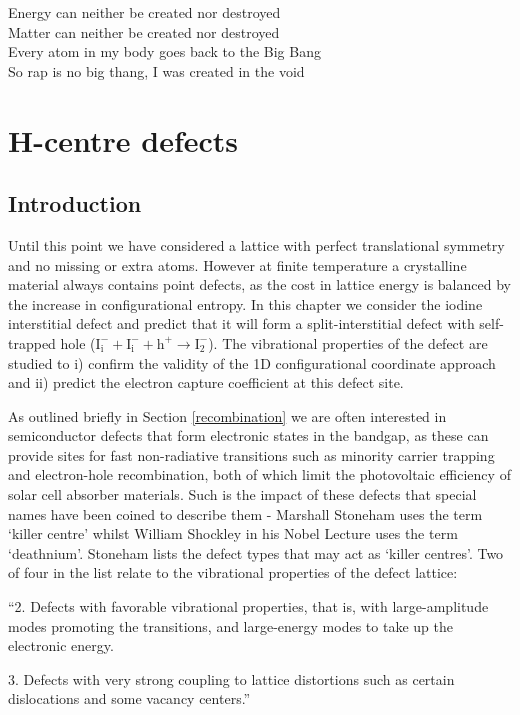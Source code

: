 \begin{savequote}[8cm]
Energy can neither be created nor destroyed \\
Matter can neither be created nor destroyed \\
Every atom in my body goes back to the Big Bang \\
So rap is no big thang, I was created in the void
\end{savequote}

\chapter{\label{ch:6-defects}H-centre defects}

\section{Introduction}

Until this point we have considered a lattice with perfect translational symmetry and no missing or extra atoms. However at finite temperature a crystalline material always contains point defects, as the cost in lattice energy is balanced by the increase in configurational entropy.
In this chapter we consider the iodine interstitial defect and predict that it will form a split-interstitial defect with self-trapped hole ($\mathrm{I}_\mathrm{i}^-+\mathrm{I}_\mathrm{i}^-+\mathrm{h}^+ \rightarrow \mathrm{I}_\mathrm{2}^-$). The vibrational properties of the defect are studied to i) confirm the validity of the 1D configurational coordinate approach and ii) predict the electron capture coefficient at this defect site.

As outlined briefly in Section \ref{recombination} we are often interested in semiconductor defects that form electronic states in the bandgap, as these can provide sites for fast non-radiative transitions such as minority carrier trapping and electron-hole recombination, both of which limit the photovoltaic efficiency of solar cell absorber materials. Such is the impact of these defects that special names have been coined to describe them - Marshall Stoneham uses the term `killer centre' whilst William Shockley in his Nobel Lecture uses the term `deathnium'.\autocite{}
Stoneham lists the defect types that may act as `killer centres'. Two of four in the list relate to the vibrational properties of the defect lattice:

\begin{displayquote}
``2. Defects with favorable vibrational properties, that is, with large-amplitude modes promoting the transitions, and large-energy modes to take up the electronic energy.

3.  Defects with very strong coupling to lattice distortions such as certain dislocations and some vacancy centers.''
\end{displayquote}

